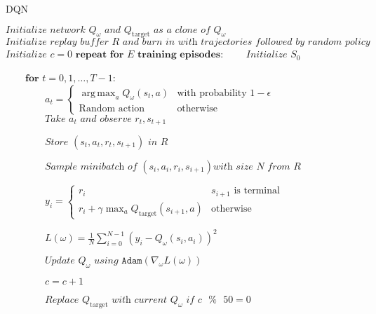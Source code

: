 \documentclass[12pt]{article}
\DeclareMathOperator*{\argmax}{arg\,max}
\begin{document}
\begin{algorithm}
\caption{DQN\label{alg:dqn}}
\begin{algorithmic}[1]
\State $\textit{Initialize network } Q_{\omega} \textit{ and } Q_{\text{target}} \textit{ as a clone of }  Q_{\omega}$
\State $\textit{Initialize replay buffer } R \textit{ and burn in with trajectories followed by random policy} $
\State $\textit{Initialize }c = 0$
\State $\textbf{repeat for $E$ training episodes:}$
\State $\qquad\textit{Initialize }S_0$


\State $\qquad\textbf{for } t = 0 , 1 , \dots , T-1 $: \label{line:dqn:1}
\State $\qquad\qquad a_t = 
\begin{cases} 
\argmax_a{Q_{\omega}(s_t,a)} & \text{with probability } 1-\epsilon
\\
\text{Random action} & \text{otherwise}
\end{cases}$
\State $\qquad\qquad\textit{Take } a_t \textit{ and observe } r_t, s_{t+1}$

\State $\qquad\qquad\textit{Store } (s_t, a_t, r_t, s_{t+1}) \textit{ in } R$

\State $\qquad\qquad\textit{Sample minibatch of } (s_i, a_i, r_i, s_{i+1}) \textit{with size } N \textit{ from } R$

\State $\qquad\qquad y_i = 
\begin{cases} 
r_i & s_{i+1} \text{ is terminal}
\\
r_i + \gamma\max_a{Q_{\text{target}}(s_{i+1},a)} & \text{otherwise}

\end{cases}$

\State $\qquad\qquad L(\omega) = \frac{1}{N} \sum_{i=0}^{N-1} (y_i - Q_{\omega}(s_i,a_i))^2 $

\State $\qquad\qquad\textit{Update $Q_\omega$ using } \texttt{Adam}\left(\nabla_\omega L(\omega)\right)$

\State $\qquad\qquad c = c + 1$

\State $\qquad\qquad \textit{Replace } Q_{\text{target}} \textit{ with current } Q_{\omega} \textit{ if }   c \textit{ } \% \textit{ } 50 = 0$ 

\EndProcedure
\end{algorithmic}
\label{alg:dqn}
\end{algorithm}

\newpage

\nocite{*}


\end{document}
